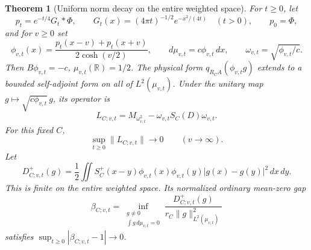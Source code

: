 \documentclass[11pt]{article}
\newtheorem{theorem}{Theorem}
\theoremstyle{remark}\newtheorem{remark}[theorem]{Remark}
\begin{document}
\begin{theorem}[Uniform norm decay on the entire weighted space]
\label{thm:rest-shifted-global-norm}
For \(t\ge0\), let
\[
 p_t=e^{-t/4}G_t*\Phi,\qquad
 G_t(x)=(4\pi t)^{-1/2}e^{-x^2/(4t)}\quad(t>0),\qquad p_0=\Phi,
 \tag{RGC22}
\]
and for \(v\ge0\) set
\[
 \phi_{v,t}(x)=
 \frac{p_t(x-v)+p_t(x+v)}{2\cosh(v/2)},\qquad
 d\mu_{v,t}=c\phi_{v,t}\,dx,\qquad
 \omega_{v,t}=\sqrt{\phi_{v,t}/c}.
 \tag{RGC23}
\]
Then \(B\phi_{v,t}=-c\), \(\mu_{v,t}(\mathbb R)=1/2\).
The physical form \(q_{R_CA}(\phi_{v,t}g)\) extends to a bounded
self-adjoint form on all of \(L^2(\mu_{v,t})\). Under the unitary
map \(g\mapsto\sqrt{c\phi_{v,t}}\,g\), its operator is
\[
 L_{C;v,t}=M_{\omega_{v,t}^2}
     -\omega_{v,t} S_C(D)\omega_{v,t}.
 \tag{RGC24}
\]
For this fixed \(C\),
\[
 \sup_{t\ge0}\|L_{C;v,t}\|\longrightarrow0
                  \qquad(v\to\infty).
 \tag{RGC25}
\]
Let
\[
 D_{C;v,t}^+(g)=\frac12\iint
 S_C^+(x-y)\phi_{v,t}(x)\phi_{v,t}(y)
                  |g(x)-g(y)|^2\,dx\,dy .
 \tag{RGC26}
\]
This is finite on the entire weighted space. Its normalized
ordinary mean-zero gap
\[
 \beta_{C;v,t}=
 \inf_{\substack{g\ne0\\ \int g\,d\mu_{v,t}=0}}
 \frac{D_{C;v,t}^+(g)}
      {r_C\|g\|_{L^2(\mu_{v,t})}^2}
 \tag{RGC27}
\]
satisfies
\(\sup_{t\ge0}|\beta_{C;v,t}-1|\to0\).
\end{theorem}
\end{document}
